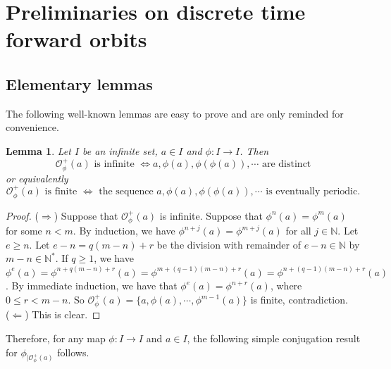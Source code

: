 \documentclass[a4paper,11pt]{article}
\theoremstyle{plain}
\newtheorem{lemma}{Lemma}[section]
\theoremstyle{definition}
\theoremstyle{remark}
\begin{document}
\section{Preliminaries on discrete time forward orbits}

\subsection{Elementary lemmas}

The following well-known lemmas are easy to prove and are only reminded for convenience.

\begin{lemma} 
\label{lemmaDistinct}
Let $I$ be an infinite set, $a \in I$ and $\phi : I \to I$. Then 
\[ \mathcal{O}^{+}_\phi(a) \text { is infinite } \Leftrightarrow a, \phi(a), \phi(\phi(a)), \cdots \text{ are distinct} \]
or equivalently
\[ \mathcal{O}^{+}_\phi(a) \text { is finite } \Leftrightarrow \text{ the sequence } a, \phi(a), \phi(\phi(a)), \cdots \text{ is eventually periodic}. \]
\end{lemma}

\begin{proof}
($\Rightarrow$) Suppose that $\mathcal{O}^{+}_\phi(a)$ is infinite. Suppose that $\phi^{n}(a) = \phi^{m}(a)$ for some $n < m$. By induction, we have $\phi^{n+j}(a) = \phi^{m+j}(a)$ for all $j \in \mathbb{N}$. Let $e \geq n$. Let $e - n = q(m-n) + r$ be the division with remainder of $e - n \in \mathbb{N}$ by $m-n \in \mathbb{N}^*$. If $q \geq 1$, we have $\phi^e(a) = \phi^{n + q(m-n) + r}(a) = \phi^{m + (q-1)(m-n) + r}(a) = \phi^{n + (q-1)(m-n) + r}(a)$. By immediate induction, we have that $\phi^e(a) = \phi^{n+r}(a)$, where $0 \leq r < m-n$. So $\mathcal{O}^{+}_\phi(a) = \{a, \phi(a), \cdots, \phi^{m-1}(a)\}$ is finite, contradiction. \\
($\Leftarrow$) This is clear.
\end{proof}

Therefore, for any map $\phi : I \to I$ and $a \in I$, the following simple conjugation result for $\phi_{|\mathcal{O}^{+}_\phi(a)}$ follows.
\end{document}
